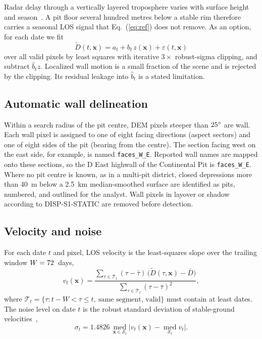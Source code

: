 \documentclass[aps,prd,twocolumn,superscriptaddress,nofootinbib,floatfix,preprintnumbers,10pt]{revtex4-2}
\begin{document}
Radar delay through a vertically layered troposphere varies with surface height and season~\cite{Doin2009,Hanssen2001}. A pit floor several hundred metres below a stable rim therefore carries a seasonal LOS signal that Eq.~(\ref{eq:ref}) does not remove. As an option, for each date we fit
\begin{equation}
\tilde{D}(t,\bm{x}) = a_t + b_t\, z(\bm{x}) + \varepsilon(t,\bm{x})
\label{eq:strat}
\end{equation}
over all valid pixels by least squares with iterative $3\times$ robust-sigma clipping, and subtract $\hat{b}_t z$. Localized wall motion is a small fraction of the scene and is rejected by the clipping. Its residual leakage into $\hat{b}_t$ is a stated limitation.

\subsection{Automatic wall delineation}

Within a search radius of the pit centre, DEM pixels steeper than $25^\circ$ are wall. Each wall pixel is assigned to one of eight facing directions (aspect sectors) and one of eight sides of the pit (bearing from the centre). The section facing west on the east side, for example, is named \texttt{faces\_W\_E}. Reported wall names are mapped onto these sections, so the D East highwall of the Continental Pit is \texttt{faces\_W\_E}. Where no pit centre is known, as in a multi-pit district, closed depressions more than 40~m below a 2.5~km median-smoothed surface are identified as pits, numbered, and outlined for the analyst. Wall pixels in layover or shadow according to DISP-S1-STATIC are removed before detection.

\subsection{Velocity and noise}

For each date $t$ and pixel, LOS velocity is the least-squares slope over the trailing window $W=72$~days,
\begin{equation}
v_t(\bm{x}) = \frac{\sum_{\tau\in\mathcal{T}_t} (\tau-\bar\tau)\,\big(\tilde D(\tau,\bm{x})-\bar{D}\big)}{\sum_{\tau\in\mathcal{T}_t} (\tau-\bar\tau)^2},
\label{eq:vel}
\end{equation}
where $\mathcal{T}_t=\{\tau: t-W<\tau\le t,\ \text{same segment, valid}\}$ must contain at least \PMinObs{} dates. The noise level on date $t$ is the robust standard deviation of stable-ground velocities~\cite{Rousseeuw1993},
\begin{equation}
\sigma_t = 1.4826\,\operatorname*{med}_{\bm{x}\in\mathcal{S}_t}\big|v_t(\bm{x}) - \operatorname*{med}_{\mathcal{S}_t} v_t\big|.
\label{eq:sigma}
\end{equation}
\end{document}
